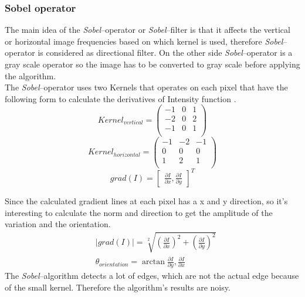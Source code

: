\documentclass[journal,final,a4paper,twoside]{PS}
\begin{document}
\subsubsection{Sobel operator}
The main idea of the \emph{Sobel}--operator or \emph{Sobel}--filter is that it affects the vertical or horizontal image frequencies based on which kernel is used, therefore \emph{Sobel}--operator is considered as directional filter. On the other side \emph{Sobel}--operator is a gray scale operator so the image has to be converted to gray scale before applying the algorithm\cite{Langaniere}.
\\
The \emph{Sobel}--operator uses two Kernels that operates on each pixel that have the following form to calculate the derivatives of Intensity function \cite{Langaniere}.
\begin{equation}
Kernel_{vertical}=\begin{pmatrix}
-1&0&1\\
-2&0&2\\
-1&0&1\\
\end{pmatrix}
\end{equation}
\begin{equation}
Kernel_{horizontal}=\begin{pmatrix}
-1&-2&-1\\
0&0&0\\
1&2&1\\
\end{pmatrix}
\end{equation}
\begin{equation}
grad(I)=\begin{bmatrix}
\frac{\partial I}{\partial x},\frac{\partial I}{\partial y}
\end{bmatrix}^T
\end{equation}


Since the calculated gradient lines at each pixel has a x and y direction, so it's interesting to calculate the norm and direction to get the amplitude of the variation and the orientation.
\begin{align}
&|grad(I)|=\sqrt[2]{\left(\frac{\partial I}{\partial x}\right)^2+\left(\frac{\partial I}{\partial y}\right)^2}\\
&\theta_{orientation}=\arctan{\frac{\partial I}{\partial y},\frac{\partial I}{\partial x}}
\end{align}
The \emph{Sobel}--algorithm detects a lot of edges, which are not the actual edge because of the small kernel. Therefore the algorithm's results are noisy. 
\end{document}
